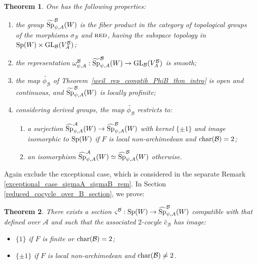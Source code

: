 \documentclass[11pt]{article}
\theoremstyle{plain}
\theoremstyle{definition}
\theoremstyle{plain}
\theoremstyle{definition}
\theoremstyle{plain}
\newtheorem{theorem}{Theorem}
\begin{document}
\begin{theorem}  One has the following properties:
\begin{enumerate}[label=\textup{\alph*)}]
\item the group $\widetilde{\textup{Sp}}_{\psi,A}^\mathcal{B}(W)$ is the fiber product in the category of topological groups of the morphisms $\sigma_\mathcal{B}$ and $\textup{\textsc{red}}$, having the subspace topology in $\textup{Sp}(W) \times \textup{GL}_\mathcal{B}(V_A^\mathcal{B})$;
\item the representation $\omega_{\psi,A}^\mathcal{B} : \widetilde{\textup{Sp}}_{\psi,A}^\mathcal{B}(W)  \to \textup{GL}_\mathcal{B}(V_A^\mathcal{B})$ is smooth;
\item the map $\widetilde{\phi_\mathcal{B}}$ of Theorem~\ref{weil_rep_comptib_PhiB_thm_intro} is open and continuous, and $\widetilde{\textup{Sp}}_{\psi,A}^\mathcal{B}(W)$ is locally profinite;
\item \label{isomorphism_thm_met_gp_B_point} considering derived groups, the map $\widetilde{\phi_\mathcal{B}}$ restricts to:
\begin{enumerate} \item[i)] a surjection $\widehat{\textup{Sp}}_{\psi,A}^\mathcal{A}(W) \to \widehat{\textup{Sp}}_{\psi,A}^\mathcal{B}(W)$ with kernel $\{\pm 1 \}$ and image isomorphic to $\textup{Sp}(W)$ if $F$ is local non-archimedean and $\textup{char}(\mathcal{B})=2$;
\item[ii)] an isomorphism $\widehat{\textup{Sp}}_{\psi,A}^\mathcal{A}(W) \simeq \widehat{\textup{Sp}}_{\psi,A}^\mathcal{B}(W)$ otherwise. \end{enumerate} \end{enumerate} \end{theorem}

Again exclude the exceptional case, which is considered in the separate Remark \ref{exceptional_case_sigmaA_sigmaB_rem}. In Section \ref{reduced_cocycle_over_B_section}, we prove:

\begin{theorem} There exists a section $\varsigma^\mathcal{B} : \textup{Sp}(W) \to \widehat{\textup{Sp}}_{\psi,A}^\mathcal{B}(W)$ compatible with that defined over $\mathcal{A}$ and such that the associated $2$-cocyle $\hat{c}_\mathcal{B}$ has image:
\begin{itemize}
\item $\{ 1 \}$ if $F$ is finite or $\textup{char}(\mathcal{B})=2$;
\item $\{ \pm 1\}$ if $F$ is local non-archimedean and $\textup{char}(\mathcal{B}) \neq 2$.
\end{itemize}
\end{theorem}
\end{document}
